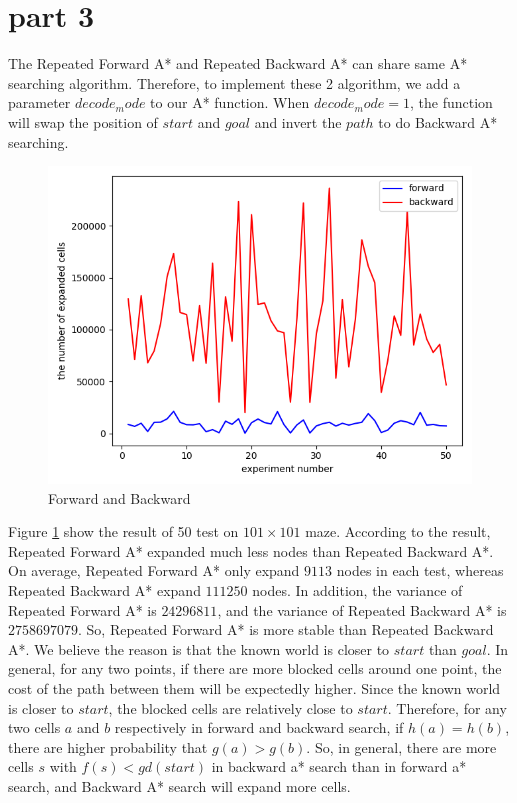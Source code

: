 \documentclass[11pt]{article}
\begin{document}
\section*{part 3}
The Repeated Forward A* and Repeated Backward A* can share same A* searching algorithm. Therefore, to implement these 2 algorithm, we add a parameter $decode_mode$ to our A* function. When $decode_mode = 1$, the function will swap the position of $start$ and $goal$ and invert the $path$ to do Backward A* searching.
	\begin{figure}[htb]
		\centering
		\includegraphics[scale = 0.3]{forward_backward.png}
		\caption{Forward and Backward}
		\label{fig:Fig3.F&B}
	\end{figure}
\newline
Figure \ref{fig:Fig3.F&B} show the result of 50 test on $101\times 101$ maze. According to the  result, Repeated Forward A* expanded much less  nodes than Repeated Backward A*. On average, Repeated Forward A* only expand $9113$ nodes in each test, whereas Repeated Backward A* expand $111250$ nodes. In addition, the variance of Repeated Forward A* is $24296811$, and the variance of Repeated Backward A* is $2758697079$. So, Repeated Forward A* is more stable than Repeated Backward A*.
\newline
We believe the reason is that the known world is closer to $start$ than $goal$. In general, for any two points, if there are more blocked cells around one point, the cost of the path between them will be expectedly higher. Since the known world is closer to $start$, the blocked cells are relatively close to $start$. Therefore, for any two cells $a$ and $b$ respectively in forward and backward search, if $h(a) = h(b)$, there are higher probability that $g(a) > g(b)$. So, in general, there are more cells $s$ with $f(s) < gd(start)$ in backward a* search than in forward a* search, and Backward A* search will expand more cells.
\end{document}
